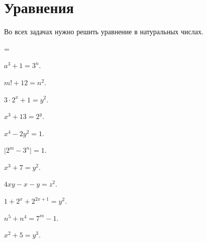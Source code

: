 

\section*{Уравнения}


Во всех задачах нужно решить уравнение в натуральных числах.

\begingroup \multicolsep=\parskip
\begin{multicols}{2}
\begin{problems}

\item
$a^3 + 1 = 3^n$.

\item
$m! + 12 = n^2$.

\item
$3 \cdot 2^x + 1 = y^2$.

\item
$x^3 + 13 = 2^y$.

\item
$x^4 - 2 y^2 = 1$.

\item
$\lvert 2^m - 3^n \rvert = 1$.

\item
$x^3 + 7 = y^2$.

\item
$4 x y - x - y = z^2$.

\item
$1 + 2^x + 2^{2x+1} = y^2$.

\item
$n^5 + n^4 = 7^m - 1$.

\item
$x^2 + 5 = y^3$.

\par\strut %

\end{problems}
\end{multicols}
\endgroup

